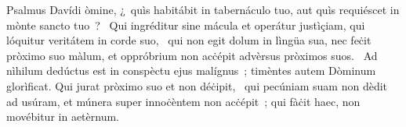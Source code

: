 { Psalmus Davídi}
{%
òmine, ¿~quìs habitábit in tabernáculo tuo, aut quìs requiéscet in mònte sancto tuo~?
~Qui ingréditur sine mácula et operátur justìçiam, qui lóquitur veritátem in corde suo,
~qui non egit dolum in lìngüa sua, nec feċit pròximo suo màlum, et oppróbrium non acċépit advèrsus pròximos suos.
~Ad nìhilum dedúctus est in conspèctu ejus malígnus~; timèntes autem Dòminum glorìficat. Qui jurat pròximo suo et non déċipit,
~qui pecúniam suam non dèdit ad usúram, et múnera super innoċèntem non acċépit~; qui fàċit haec, non movébitur in aetèrnum.
}
